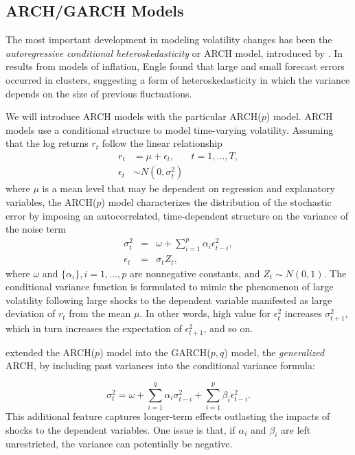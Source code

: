 	\subsection{ARCH/GARCH Models}
	The most important development in modeling volatility changes has been the \textit{autoregressive conditional heteroskedasticity} or ARCH model, introduced by \cite{engle1982}. In results from models of inflation, Engle found that large and small forecast errors occurred in clusters, suggesting a form of heteroskedasticity in which the variance depends on the size of previous fluctuations. 

We will introduce ARCH models with the particular ARCH($p$) model. ARCH models use a conditional structure to model time-varying volatility. Assuming that the log returns $r_t$ follow the linear relationship
\begin{align*}
r_t &= \mu + \epsilon_t, &  t=1,\ldots, T, \\
\epsilon_t &\sim N(0, \sigma_t^2)
\end{align*}
%
where $\mu$ is a mean level that may be dependent on regression and explanatory variables, the ARCH($p$) model characterizes the distribution of the stochastic error by imposing an autocorrelated, time-dependent structure on the variance of the noise term
\begin{eqnarray*}
	\sigma_t^2 &=& \omega + \sum_{i=1}^p \alpha_i \epsilon^2_{t-i}, \\
	\epsilon_t &=& \sigma_t Z_t,
\end{eqnarray*}
where $\omega$ and $\{ \alpha_i \}, i=1,\ldots, p$ are nonnegative constants, and $Z_t \sim N(0,1)$. The conditional variance function is formulated to mimic the phenomenon of large volatility following large shocks to the dependent variable manifested as large deviation of $r_t$ from the mean $\mu$. In other words, high value for $\epsilon_t^2$ increases $\sigma^2_{t+1}$, which in turn increases the expectation of $\epsilon_{t+1}^2$, and so on. 

\cite{bollerslev1986} extended the ARCH($p$) model into the GARCH($p,q$) model, the \textit{generalized} ARCH, by including past variances into the conditional variance formula:

	\[ \sigma_t^2 = \omega + \sum_{i=1}^q \alpha_i \sigma^2_{t-i} + \sum_{i=1}^p \beta_i \epsilon^2_{t-i}. \]
%
This additional feature captures longer-term effects outlasting the impacts of shocks to the dependent variables. One issue is that, if $\alpha_i$ and $\beta_i$ are left unrestricted, the variance can potentially be negative. 

